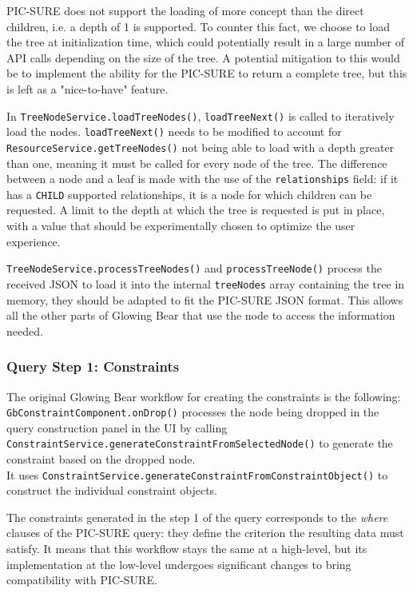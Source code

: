 PIC-SURE does not support the loading of more concept than the direct children, i.e. a depth of 1 is supported.
To counter this fact, we choose to load the tree at initialization time, which could potentially result in a large number of API calls depending on the size of the tree.
A potential mitigation to this would be to implement the ability for the PIC-SURE to return a complete tree, but this is left as a "nice-to-have" feature.

In \verb|TreeNodeService.loadTreeNodes()|, \verb|loadTreeNext()| is called to iteratively load the nodes.
\verb|loadTreeNext()| needs to be modified to account for \verb|ResourceService.getTreeNodes()| not being able to load with a depth greater than one, 
meaning it must be called for every node of the tree.
The difference between a node and a leaf is made with the use of the \verb|relationships| field: if it has a \verb|CHILD| supported relationships, it is a node for which children can be requested.
A limit to the depth at which the tree is requested is put in place, with a value that should be experimentally chosen to optimize the user experience.

\verb|TreeNodeService.processTreeNodes()| and \verb|processTreeNode()| process the received JSON to load it into the internal \verb|treeNodes| array containing the tree in memory, they should be adapted to fit the PIC-SURE JSON format.
This allows all the other parts of Glowing Bear that use the node to access the information needed.


\subsubsection{Query Step 1: Constraints}

The original Glowing Bear workflow for creating the constraints is the following: \\
\verb|GbConstraintComponent.onDrop()| processes the node being dropped in the query construction panel in the UI by calling \verb|ConstraintService.generateConstraintFromSelectedNode()| to generate the constraint based on the dropped node. \\
It uses \verb|ConstraintService.generateConstraintFromConstraintObject()| to construct the individual constraint objects.

The constraints generated in the step 1 of the query corresponds to the \emph{where} clauses of the PIC-SURE query: they define the criterion the resulting data must satisfy.
It means that this workflow stays the same at a high-level, but its implementation at the low-level undergoes significant changes to bring compatibility with PIC-SURE.

